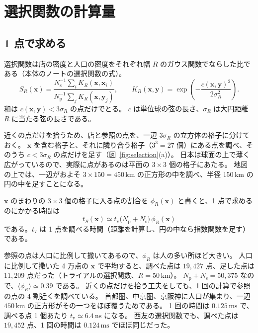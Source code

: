 \documentclass[a4paper,11pt]{ltjsarticle}
\begin{document}
\section{選択関数の計算量}
\label{sec:selection}

\subsection{1 点で求める}

選択関数は店の密度と人口の密度をそれぞれ幅 $R$ のガウス関数でならした比である（本体のノートの選択関数の式）。
\begin{equation}
  S_R(\bm{x}) = \frac{N_{\mathrm{s}}^{-1} \sum_{i} K_R(\bm{x}, \bm{x}_i)}{N_{\mathrm{p}}^{-1} \sum_{j} K_R(\bm{x}, \bm{y}_j)},
  \qquad
  K_R(\bm{x}, \bm{y}) = \exp\!\left(-\frac{c(\bm{x}, \bm{y})^2}{2\sigma_R^2}\right).
  \label{eq:selection}
\end{equation}
和は $c(\bm{x}, \bm{y}) < 3\sigma_R$ の点だけでとる。
$c$ は単位球の弦の長さ、$\sigma_R$ は大円距離 $R$ に当たる弦の長さである。

近くの点だけを拾うため、店と参照の点を、一辺 $3\sigma_R$ の立方体の格子に分けておく。
$\bm{x}$ を含む格子と、それに隣り合う格子（$3^3 = 27$ 個）にある点を調べ、そのうち $c < 3\sigma_R$ の点だけを足す（図~\ref{fig:selection}(a)）。
日本は球面の上で薄く広がっているので、実際に点があるのは平面の $3 \times 3$ 個の格子にあたる。
地図の上では、一辺がおよそ $3 \times 150 = 450\,\mathrm{km}$ の正方形の中を調べ、半径 $150\,\mathrm{km}$ の円の中を足すことになる。

$\bm{x}$ のまわりの $3 \times 3$ 個の格子に入る点の割合を $\phi_R(\bm{x})$ と書くと、1 点で求めるのにかかる時間は
\begin{equation}
  t_S(\bm{x}) \simeq t_{\mathrm{v}} \bigl(N_{\mathrm{p}} + N_{\mathrm{s}}\bigr)\, \phi_R(\bm{x})
  \label{eq:t-eval}
\end{equation}
である。$t_{\mathrm{v}}$ は 1 点を調べる時間（距離を計算し、円の中なら指数関数を足す）である。

参照の点は人口に比例して撒いてあるので、$\phi_R$ は人の多い所ほど大きい。
人口に比例して撒いた 4 万点の $\bm{x}$ で平均すると、調べた点は $19{,}427$ 点、足した点は $11{,}209$ 点だった（トライアルの選択関数、$R = 50\,\mathrm{km}$）。
$N_{\mathrm{p}} + N_{\mathrm{s}} = 50{,}375$ なので、$\langle \phi_R \rangle \simeq 0.39$ である。
近くの点だけを拾う工夫をしても、1 回の計算で参照の点の 4 割近くを調べている。
首都圏、中京圏、京阪神に人口が集まり、一辺 $450\,\mathrm{km}$ の正方形がその一つをほぼ覆うためである。
1 回の時間は $0.125\,\mathrm{ms}$ で、調べる点 1 個あたり $t_{\mathrm{v}} \simeq 6.4\,\mathrm{ns}$ になる。
西友の選択関数でも、調べた点は $19{,}452$ 点、1 回の時間は $0.124\,\mathrm{ms}$ でほぼ同じだった。
\end{document}
